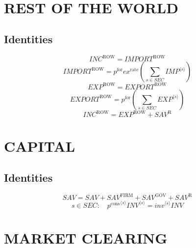 \section{REST OF THE WORLD}

\subsection{Identities}

\begin{equation}
{I\!N\!C}^{\mathrm{ROW}} = {I\!M\!P\!O\!R\!T}^{\mathrm{ROW}}
\end{equation}
\begin{equation}
{I\!M\!P\!O\!R\!T}^{\mathrm{ROW}} = {p^{\mathrm{for}}} {{e\!x}^{\mathrm{rate}}} \left(\sum_{s\in {S\!E\!C}} {{I\!M\!P}}^{\langle s\rangle}\right)
\end{equation}
\begin{equation}
{E\!X\!P}^{\mathrm{ROW}} = {E\!X\!P\!O\!R\!T}^{\mathrm{ROW}}
\end{equation}
\begin{equation}
{E\!X\!P\!O\!R\!T}^{\mathrm{ROW}} = {p^{\mathrm{for}}} \left(\sum_{s\in {S\!E\!C}} {{E\!X\!P}}^{\langle s\rangle}\right)
\end{equation}
\begin{equation}
{I\!N\!C}^{\mathrm{ROW}} = {E\!X\!P}^{\mathrm{ROW}} + {S\!A\!V}^{\mathrm{R}}
\end{equation}




\section{CAPITAL}

\subsection{Identities}

\begin{equation}
{S\!A\!V} = {S\!A\!V} + {S\!A\!V}^{\mathrm{FIRM}} + {S\!A\!V}^{\mathrm{GOV}} + {S\!A\!V}^{\mathrm{R}}
\end{equation}
\begin{equation}
s\in {S\!E\!C}\colon\quad {{p^{\mathrm{cons}}}^{\langle s\rangle}} {{{I\!N\!V}}^{\langle s\rangle}} = {{{i\!n\!v}}^{\langle s\rangle}} {{I\!N\!V}}
\end{equation}




\section{MARKET CLEARING}

